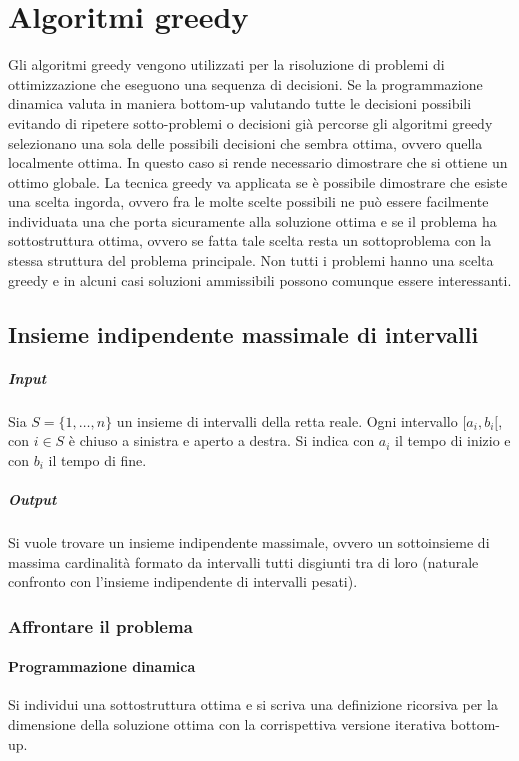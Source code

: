 \chapter{Algoritmi greedy}
	Gli algoritmi greedy vengono utilizzati per la risoluzione di problemi di ottimizzazione che eseguono una sequenza di decisioni. Se la programmazione dinamica valuta in maniera bottom-up
	valutando tutte le decisioni possibili evitando di ripetere sotto-problemi o decisioni gi\`a percorse gli algoritmi greedy selezionano una sola delle possibili decisioni che sembra
	ottima, ovvero quella localmente ottima. In questo caso si rende necessario dimostrare che si ottiene un ottimo globale. La tecnica greedy va applicata se \`e possibile dimostrare che 
	esiste una scelta ingorda, ovvero fra le molte scelte possibili ne pu\`o essere facilmente individuata una che porta sicuramente alla soluzione ottima e se il problema ha sottostruttura
	ottima, ovvero se fatta tale scelta resta un sottoproblema con la stessa struttura del problema principale. Non tutti i problemi hanno una scelta greedy e in alcuni casi soluzioni 
	ammissibili possono comunque essere interessanti.
	\section{Insieme indipendente massimale di intervalli}
		\paragraph{Input}
		Sia $S=\{1, \dots, n\}$ un insieme di intervalli della retta reale. Ogni intervallo $[a_i, b_i[$, con $i\in S$ \`e chiuso a sinistra e aperto a destra. Si indica con $a_i$ il tempo di
		inizio e con $b_i$ il tempo di fine. 
		\paragraph{Output}
		Si vuole trovare un insieme indipendente massimale, ovvero un sottoinsieme di massima cardinalit\`a formato da intervalli tutti disgiunti tra di loro (naturale confronto con l'insieme
		indipendente di intervalli pesati).
		\subsection{Affrontare il problema}
		\subsubsection{Programmazione dinamica}
		Si individui una sottostruttura ottima e si scriva una definizione ricorsiva per la dimensione della soluzione ottima con la corrispettiva versione iterativa bottom-up.

